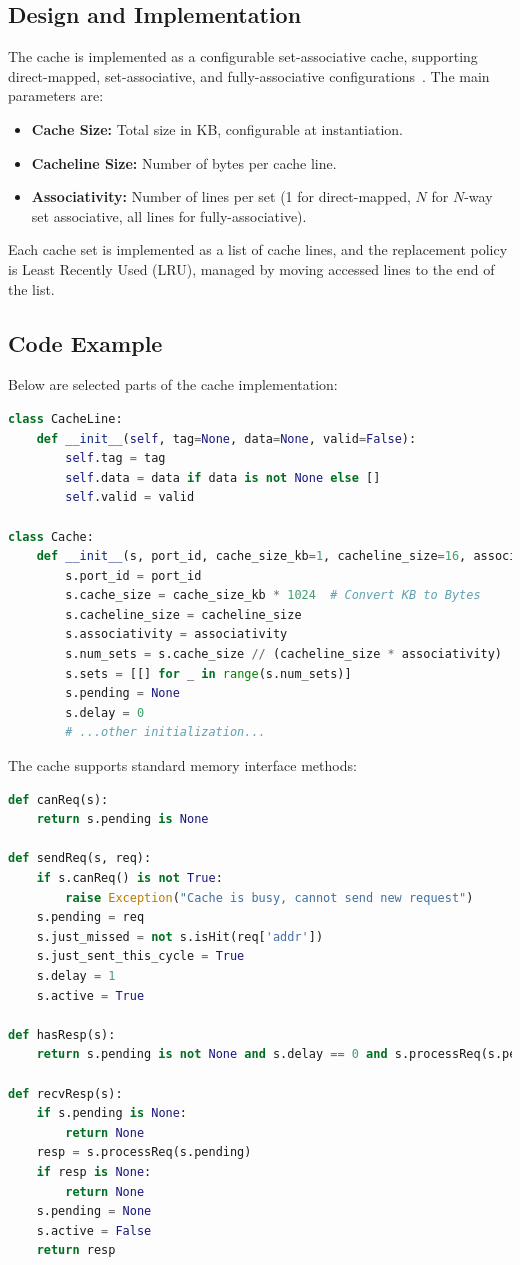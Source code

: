 \documentclass[12pt,a4paper]{report}
\begin{document}
\subsection{Design and Implementation}
The cache is implemented as a configurable set-associative cache, supporting direct-mapped, set-associative, and fully-associative configurations~\cite{sciencedirect_set_associative}. The main parameters are:
\begin{itemize}
  \item \textbf{Cache Size:} Total size in KB, configurable at instantiation.
  \item \textbf{Cacheline Size:} Number of bytes per cache line.
  \item \textbf{Associativity:} Number of lines per set (1 for direct-mapped, $N$ for $N$-way set associative, all lines for fully-associative).
\end{itemize}
Each cache set is implemented as a list of cache lines, and the replacement policy is Least Recently Used (LRU)\cite{gfg_lru_cache}, managed by moving accessed lines to the end of the list.

\subsection{Code Example}
Below are selected parts of the cache implementation:

\begin{lstlisting}[language=Python]
class CacheLine:
    def __init__(self, tag=None, data=None, valid=False):
        self.tag = tag
        self.data = data if data is not None else []
        self.valid = valid

class Cache:
    def __init__(s, port_id, cache_size_kb=1, cacheline_size=16, associativity=1):
        s.port_id = port_id
        s.cache_size = cache_size_kb * 1024  # Convert KB to Bytes
        s.cacheline_size = cacheline_size
        s.associativity = associativity
        s.num_sets = s.cache_size // (cacheline_size * associativity)
        s.sets = [[] for _ in range(s.num_sets)]
        s.pending = None
        s.delay = 0
        # ...other initialization...
\end{lstlisting}

The cache supports standard memory interface methods:

\begin{lstlisting}[language=Python]
def canReq(s):
    return s.pending is None

def sendReq(s, req):
    if s.canReq() is not True:
        raise Exception("Cache is busy, cannot send new request")
    s.pending = req
    s.just_missed = not s.isHit(req['addr'])
    s.just_sent_this_cycle = True
    s.delay = 1
    s.active = True

def hasResp(s):
    return s.pending is not None and s.delay == 0 and s.processReq(s.pending) is not None

def recvResp(s):
    if s.pending is None:
        return None
    resp = s.processReq(s.pending)
    if resp is None:
        return None
    s.pending = None
    s.active = False
    return resp
\end{lstlisting}
\end{document}
